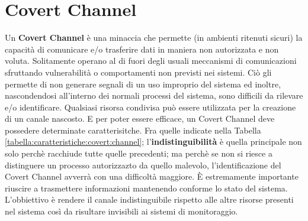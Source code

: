 \section{Covert Channel} 
Un \textbf{Covert Channel} \cite{covert_channel_tipologie1}\cite{covert_channel_tipologie2} è una minaccia che permette (in ambienti ritenuti sicuri) la capacità di 
comunicare e/o trasferire dati in maniera non autorizzata e non voluta. 
Solitamente operano al di fuori degli usuali meccanismi di comunicazioni sfruttando vulnerabilità o comportamenti non previsti nei sistemi.  
Ciò gli permette di non generare segnali di un uso improprio del sistema ed inoltre, 
nascondendosi all'interno dei normali processi del sistema, sono difficili da rilevare e/o identificare. 
\vspace{2ex} \newline 
Qualsiasi risorsa condivisa può essere utilizzata per la creazione di un canale nascosto.  
E per poter essere efficace, un Covert Channel deve possedere determinate caratterisitche. 
Fra quelle indicate nella Tabella \ref{tabella:caratteristiche:covert:channel};  
l'\textbf{indistinguibilità} è quella principale 
non solo perchè racchiude tutte quelle precedenti; 
ma perchè se non si riesce a distinguere un processo 
autorizzazto da quello malevolo, l'identificazione del 
Covert Channel avverrà con una difficoltà maggiore. 
\vspace{2ex} \newline
\MakeUppercase{è} estremamente importante riuscire a trasmettere informazioni mantenendo conforme lo stato del sistema. 
L'obbiettivo è rendere il canale indistinguibile rispetto alle altre risorse presenti nel sistema così da risultare invisibili ai sistemi di monitoraggio. 

